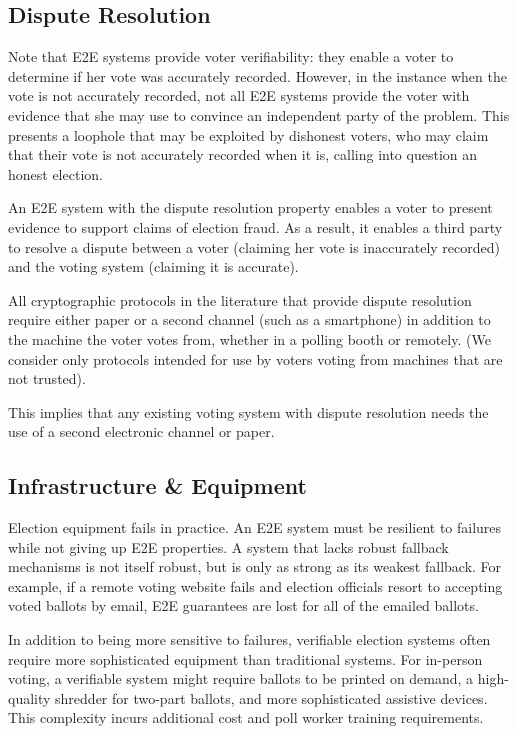 \subsection{Dispute Resolution}

Note that E2E systems provide voter verifiability: they enable a voter to determine if her vote was accurately recorded. However, in the instance when the vote is not accurately recorded, not all E2E systems provide the voter with evidence that she may use to convince an independent party of the problem. This presents a loophole that may be exploited by dishonest voters, who may claim that their vote is not accurately recorded when it is, calling into question an honest election. 

An E2E system with the dispute resolution property enables a voter to present evidence to support claims of election fraud. As a result, it enables a third party to resolve a dispute between a voter (claiming her vote is inaccurately recorded) and the voting system (claiming it is accurate). 

All cryptographic protocols in the literature that provide dispute resolution require either paper or a second channel (such as a smartphone) in addition to the machine the voter votes from, whether in a polling booth or remotely. (We consider only protocols intended for use by voters voting from machines that are not trusted). 

This implies that any existing voting system with dispute resolution needs the use of a second electronic channel or paper.  

\subsection{Infrastructure \& Equipment}

Election equipment fails in practice. An E2E system must be resilient
to failures while not giving up E2E properties. A system that lacks
robust fallback mechanisms is not itself robust, but is only as strong
as its weakest fallback. For example, if a remote voting website fails
and election officials resort to accepting voted ballots by email, E2E
guarantees are lost for all of the emailed ballots.

In addition to being more sensitive to failures, verifiable election
systems often require more sophisticated equipment than traditional
systems. For in-person voting, a verifiable system might require
ballots to be printed on demand, a high-quality shredder for two-part
ballots, and more sophisticated assistive devices. This complexity
incurs additional cost and poll worker training requirements.

